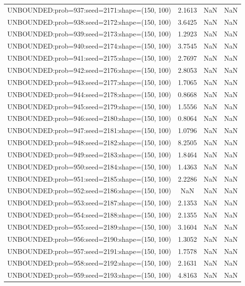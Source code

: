 \begin{longtable}{lccc}
UNBOUNDED:prob=937:seed=2171:shape=(150, 100) &  2.1613 &   NaN &    NaN \\
UNBOUNDED:prob=938:seed=2172:shape=(150, 100) &  3.6425 &   NaN &    NaN \\
UNBOUNDED:prob=939:seed=2173:shape=(150, 100) &  1.2923 &   NaN &    NaN \\
UNBOUNDED:prob=940:seed=2174:shape=(150, 100) &  3.7545 &   NaN &    NaN \\
UNBOUNDED:prob=941:seed=2175:shape=(150, 100) &  2.7697 &   NaN &    NaN \\
UNBOUNDED:prob=942:seed=2176:shape=(150, 100) &  2.8053 &   NaN &    NaN \\
UNBOUNDED:prob=943:seed=2177:shape=(150, 100) &  1.7065 &   NaN &    NaN \\
UNBOUNDED:prob=944:seed=2178:shape=(150, 100) &  0.8668 &   NaN &    NaN \\
UNBOUNDED:prob=945:seed=2179:shape=(150, 100) &  1.5556 &   NaN &    NaN \\
UNBOUNDED:prob=946:seed=2180:shape=(150, 100) &  0.8064 &   NaN &    NaN \\
UNBOUNDED:prob=947:seed=2181:shape=(150, 100) &  1.0796 &   NaN &    NaN \\
UNBOUNDED:prob=948:seed=2182:shape=(150, 100) &  8.2505 &   NaN &    NaN \\
UNBOUNDED:prob=949:seed=2183:shape=(150, 100) &  1.8464 &   NaN &    NaN \\
UNBOUNDED:prob=950:seed=2184:shape=(150, 100) &  1.4363 &   NaN &    NaN \\
UNBOUNDED:prob=951:seed=2185:shape=(150, 100) &  2.2286 &   NaN &    NaN \\
UNBOUNDED:prob=952:seed=2186:shape=(150, 100) &     NaN &   NaN &    NaN \\
UNBOUNDED:prob=953:seed=2187:shape=(150, 100) &  2.1353 &   NaN &    NaN \\
UNBOUNDED:prob=954:seed=2188:shape=(150, 100) &  2.1355 &   NaN &    NaN \\
UNBOUNDED:prob=955:seed=2189:shape=(150, 100) &  3.1604 &   NaN &    NaN \\
UNBOUNDED:prob=956:seed=2190:shape=(150, 100) &  1.3052 &   NaN &    NaN \\
UNBOUNDED:prob=957:seed=2191:shape=(150, 100) &  1.7578 &   NaN &    NaN \\
UNBOUNDED:prob=958:seed=2192:shape=(150, 100) &  2.1631 &   NaN &    NaN \\
UNBOUNDED:prob=959:seed=2193:shape=(150, 100) &  4.8163 &   NaN &    NaN \\

\end{longtable}
